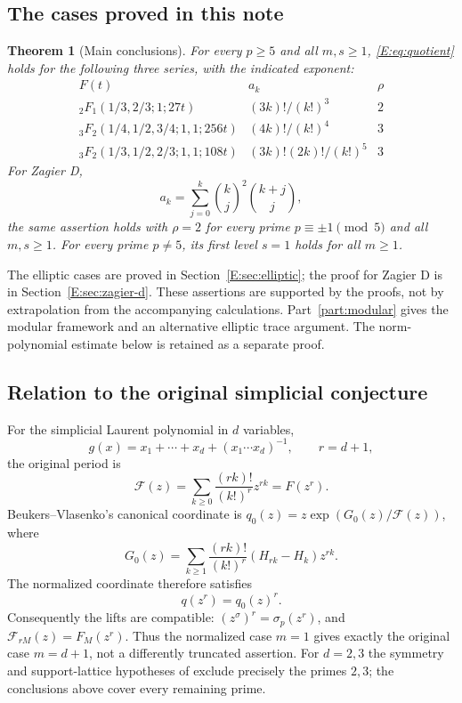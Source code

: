 \documentclass[11pt,a4paper]{article}
\newtheorem{theorem}{Theorem}[section]
\theoremstyle{definition}\newtheorem{definition}[theorem]{Definition}
\theoremstyle{remark}\newtheorem{remark}[theorem]{Remark}
\numberwithin{equation}{section}
\begin{document}
\subsection{The cases proved in this note}

\begin{theorem}[Main conclusions]\label{E:thm:summary}
For every $p\geq5$ and all $m,s\geq1$, \eqref{E:eq:quotient} holds for the
following three series, with the indicated exponent:
\[
\begin{array}{c|c|c}
F(t)&a_k&\rho\\ \hline
{}_2F_1(1/3,2/3;1;27t)&(3k)!/(k!)^3&2\\
{}_3F_2(1/4,1/2,3/4;1,1;256t)&(4k)!/(k!)^4&3\\
{}_3F_2(1/3,1/2,2/3;1,1;108t)&(3k)!(2k)!/(k!)^5&3
\end{array}
\]
For Zagier D,
\[
 a_k=\sum_{j=0}^k\binom kj^2\binom{k+j}{j},
\]
the same assertion holds with $\rho=2$ for every prime
$p\equiv\pm1\pmod5$ and all $m,s\geq1$.
For every prime $p\ne5$, its first level $s=1$ holds for all $m\geq1$.
\end{theorem}

The elliptic cases are proved in Section~\ref{E:sec:elliptic}; the proof for
Zagier D is in Section~\ref{E:sec:zagier-d}.  These assertions are supported by
the proofs, not by extrapolation from the accompanying calculations.
Part~\ref{part:modular} gives the modular framework and an alternative elliptic trace argument. The norm-polynomial estimate below is retained as a separate proof.

\subsection{Relation to the original simplicial conjecture}

For the simplicial Laurent polynomial in $d$ variables,
\[
 g(x)=x_1+\cdots+x_d+(x_1\cdots x_d)^{-1},\qquad r=d+1,
\]
the original period is
\[
 \mathcal F(z)=\sum_{k\geq0}\frac{(rk)!}{(k!)^r}z^{rk}=F(z^r).
\]
Beukers--Vlasenko's canonical coordinate is
$q_0(z)=z\exp(G_0(z)/\mathcal F(z))$, where
\[
 G_0(z)=\sum_{k\geq1}\frac{(rk)!}{(k!)^r}
                    (H_{rk}-H_k)z^{rk}.
\]
The normalized coordinate therefore satisfies
\[
 q(z^r)=q_0(z)^r.
\]
Consequently the lifts are compatible:
$(z^{\sigma})^r=\sigma_p(z^r)$, and
$\mathcal F_{rM}(z)=F_M(z^r)$.
Thus the normalized case $m=1$ gives exactly the original case $m=d+1$,
not a differently truncated assertion.  For $d=2,3$ the symmetry and
support-lattice hypotheses of \cite[Theorem 7.3]{BV3} exclude precisely
the primes $2,3$; the conclusions above cover every remaining prime.
\end{document}
